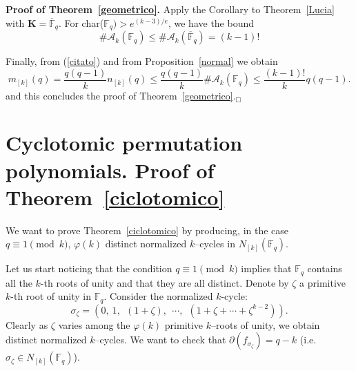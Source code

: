 \documentclass[a4paper,twoside]{article}
\begin{document}
\noindent\textbf{Proof of Theorem~\ref{geometrico}.}
Apply the Corollary to Theorem~\ref{Lucia} with
$\mathbf K=\overline{\mathbb F}_q$.
For char($\mathbb F_q)>e^{(k-3)/e}$, we have the bound
$$\#\mathcal A_k(\mathbb F_q)\leq \#\mathcal A_k(\overline{\mathbb F}_q)= (k-1)!$$

Finally, from (\ref{citato}) and from Proposition~\ref{normal} we obtain
$$m_{[k]}(q)= \frac{q(q-1)}{k}n_{[k]}(q)
\leq \frac{q(q-1)}{k}\#\mathcal A_k({\mathbb F}_q)
\leq \frac{(k-1)!}{k}q(q-1).$$
and this concludes the proof of Theorem~\ref{geometrico}.\hfill$_\Box$\medskip


\section{Cyclotomic permutation polynomials. Proof of Theorem~\ref{ciclotomico}}

We want to prove Theorem~\ref{ciclotomico} by producing, in the
case $q\equiv1\pmod k$, $\varphi(k)$ distinct normalized
$k$--cycles in $N_{[k]}(\mathbb F_q)$.

Let us start noticing that the condition $q\equiv1\pmod k$ implies
that $\mathbb F_q$ contains all the $k$-th roots of unity and that
they are all distinct. Denote by $\zeta$ a primitive $k$-th root
of unity in ${\mathbb F}_q$. Consider the normalized $k$-cycle:
$$\sigma_\zeta=\left(0,\ 1,\ \ (1+\zeta),\ \ \cdots,
 \ \  (1+\zeta+\cdots +\zeta^{k-2})\right).$$
Clearly as $\zeta$ varies among the $\varphi(k)$ primitive
$k$--roots of unity, we obtain distinct normalized $k$--cycles. We
want to check that $\partial(f_{\sigma_\zeta}) =q-k$ (i.e.
$\sigma_\zeta\in N_{[k]}(\mathbb F_q)$).
\end{document}
